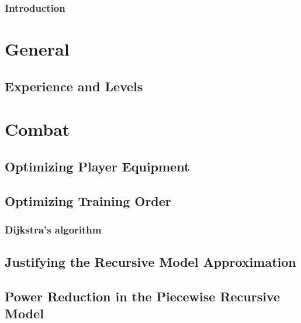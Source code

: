 \documentclass[10pt,a4paper]{report}
\begin{document}
	
	\tableofcontents
	\newpage

	\section*{Introduction}
		
	
	\part{General}
		\chapter{Experience and Levels}\label{chp:experience_and_levels}
			

	\part{Combat}
		
		
		
		
		\chapter{Optimizing Player Equipment}
			
		\chapter{Optimizing Training Order}
			\section{Dijkstra's algorithm}
		
		\begin{appendices}
			\chapter{Justifying the Recursive Model Approximation}\label{combat-app:recursive_justification}
				
			\chapter{Power Reduction in the Piecewise Recursive Model}\label{combat-app:power_reduction}
				
		\end{appendices}
\end{document}
